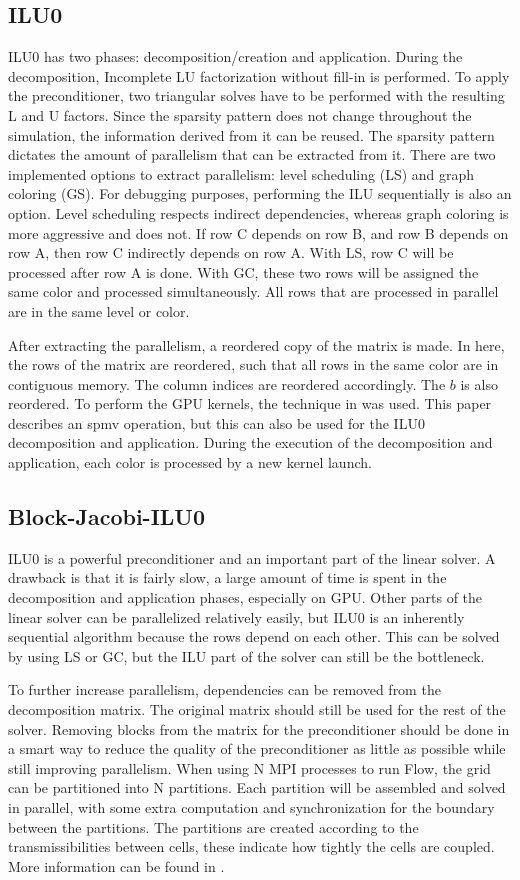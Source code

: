 \subsection{ILU0}
ILU0 has two phases: decomposition/creation and application.
During the decomposition, Incomplete LU factorization without fill-in is performed.
To apply the preconditioner, two triangular solves have to be performed with the resulting L and U factors.
Since the sparsity pattern does not change throughout the simulation, the information derived from it can be reused.
The sparsity pattern dictates the amount of parallelism that can be extracted from it.
There are two implemented options to extract parallelism: level scheduling (LS) and graph coloring (GS).
For debugging purposes, performing the ILU sequentially is also an option.
Level scheduling respects indirect dependencies, whereas graph coloring is more aggressive and does not.
If row C depends on row B, and row B depends on row A, then row C indirectly depends on row A.
With LS, row C will be processed after row A is done.
With GC, these two rows will be assigned the same color and processed simultaneously.
All rows that are processed in parallel are in the same level or color.

After extracting the parallelism, a reordered copy of the matrix is made.
In here, the rows of the matrix are reordered, such that all rows in the same color are in contiguous memory.
The column indices are reordered accordingly.
The $b$ is also reordered.
To perform the GPU kernels, the technique in \cite{blocked_spmv} was used.
This paper describes an spmv operation, but this can also be used for the ILU0 decomposition and application.
During the execution of the decomposition and application, each color is processed by a new kernel launch.

\subsection{Block-Jacobi-ILU0}
\label{lab:blockjacobi}
ILU0 is a powerful preconditioner and an important part of the linear solver.
A drawback is that it is fairly slow, a large amount of time is spent in the decomposition and application phases, especially on GPU.
Other parts of the linear solver can be parallelized relatively easily, but ILU0 is an inherently sequential algorithm because the rows depend on each other.
This can be solved by using LS or GC, but the ILU part of the solver can still be the bottleneck.

To further increase parallelism, dependencies can be removed from the decomposition matrix.
The original matrix should still be used for the rest of the solver.
Removing blocks from the matrix for the preconditioner should be done in a smart way to reduce the quality of the preconditioner as little as possible while still improving parallelism.
When using N MPI processes to run Flow, the grid can be partitioned into N partitions.
Each partition will be assembled and solved in parallel, with some extra computation and synchronization for the boundary between the partitions.
The partitions are created according to the transmissibilities between cells, these indicate how tightly the cells are coupled.
More information can be found in \cite{Thune_2021}.

